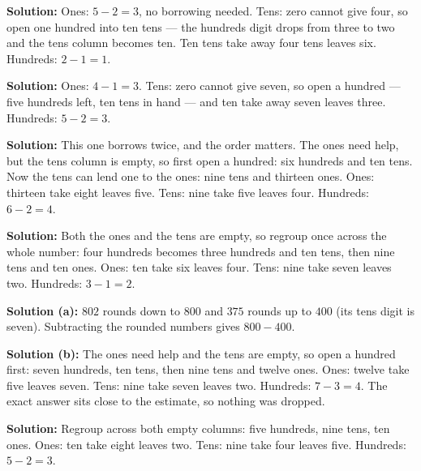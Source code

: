\documentclass[12pt]{article}
\begin{document}




\textbf{Solution:} Ones: $5 - 2 = 3$, no borrowing needed. Tens: zero cannot give four, so open one hundred into ten tens --- the hundreds digit drops from three to two and the tens column becomes ten. Ten tens take away four tens leaves six. Hundreds: $2 - 1 = 1$. 


\textbf{Solution:} Ones: $4 - 1 = 3$. Tens: zero cannot give seven, so open a hundred --- five hundreds left, ten tens in hand --- and ten take away seven leaves three. Hundreds: $5 - 2 = 3$. 


\textbf{Solution:} This one borrows twice, and the order matters. The ones need help, but the tens column is empty, so first open a hundred: six hundreds and ten tens. Now the tens can lend one to the ones: nine tens and thirteen ones. Ones: thirteen take eight leaves five. Tens: nine take five leaves four. Hundreds: $6 - 2 = 4$. 


\textbf{Solution:} Both the ones and the tens are empty, so regroup once across the whole number: four hundreds becomes three hundreds and ten tens, then nine tens and ten ones. Ones: ten take six leaves four. Tens: nine take seven leaves two. Hundreds: $3 - 1 = 2$. 


\textbf{Solution (a):} $802$ rounds down to $800$ and $375$ rounds up to $400$ (its tens digit is seven). Subtracting the rounded numbers gives $800 - 400$. 

\textbf{Solution (b):} The ones need help and the tens are empty, so open a hundred first: seven hundreds, ten tens, then nine tens and twelve ones. Ones: twelve take five leaves seven. Tens: nine take seven leaves two. Hundreds: $7 - 3 = 4$. The exact answer sits close to the estimate, so nothing was dropped. 


\textbf{Solution:} Regroup across both empty columns: five hundreds, nine tens, ten ones. Ones: ten take eight leaves two. Tens: nine take four leaves five. Hundreds: $5 - 2 = 3$. 
\end{document}

